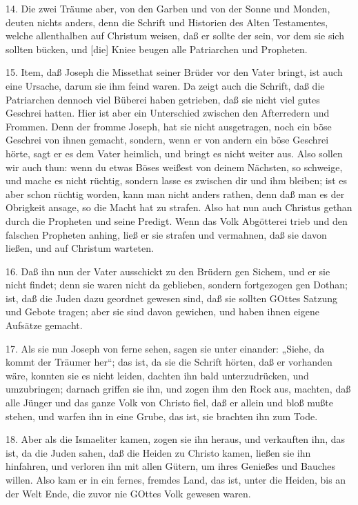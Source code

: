 14. Die zwei Träume aber, von den Garben und von der Sonne und Monden, deuten nichts anders, denn die Schrift und Historien des Alten Testamentes, welche allenthalben auf Christum weisen, daß er sollte der sein, vor dem sie sich sollten bücken, und [die] Kniee beugen alle Patriarchen und Propheten.

15. Item, daß Joseph die Missethat seiner Brüder vor den Vater bringt, ist auch eine Ursache, darum sie ihm feind waren. Da zeigt auch die Schrift, daß die Patriarchen dennoch viel Büberei haben getrieben, daß sie nicht viel gutes Geschrei hatten. Hier ist aber ein Unterschied zwischen den Afterredern und Frommen. Denn der fromme Joseph, hat sie nicht ausgetragen, noch ein böse Geschrei von ihnen gemacht, sondern, wenn er von andern ein böse Geschrei hörte, sagt er es dem Vater heimlich, und bringt es nicht weiter aus. Also sollen wir auch thun: wenn du etwas Böses weißest von deinem Nächsten, so schweige, und mache es nicht rüchtig, sondern lasse es zwischen dir und ihm bleiben; ist es aber schon rüchtig worden, kann man nicht anders rathen, denn daß man es der Obrigkeit ansage, so die Macht hat zu strafen. Also hat nun auch Christus gethan durch die Propheten und seine Predigt. Wenn das Volk Abgötterei trieb und den falschen Propheten anhing, ließ er sie strafen und vermahnen, daß sie davon ließen, und auf Christum warteten.

16. Daß ihn nun der Vater ausschickt zu den Brüdern gen Sichem, und er sie nicht findet; denn sie waren nicht da geblieben, sondern fortgezogen gen Dothan; ist, daß die Juden dazu geordnet gewesen sind, daß sie sollten GOttes Satzung und Gebote tragen; aber sie sind davon gewichen, und haben ihnen eigene Aufsätze gemacht.

17. Als sie nun Joseph von ferne sehen, sagen sie unter einander: „Siehe, da kommt der Träumer her“; das ist, da sie die Schrift hörten, daß er vorhanden wäre, konnten sie es nicht leiden, dachten ihn bald unterzudrücken, und umzubringen; darnach griffen sie ihn, und zogen ihm den Rock aus, machten, daß alle Jünger und das ganze Volk von Christo fiel, daß er allein und bloß mußte stehen, und warfen ihn in eine Grube, das ist, sie brachten ihn zum Tode.

18. Aber als die Ismaeliter kamen, zogen sie ihn heraus, und verkauften ihn, das ist, da die Juden sahen, daß die Heiden zu Christo kamen, ließen sie ihn hinfahren, und verloren ihn mit allen Gütern, um ihres Genießes und Bauches willen. Also kam er in ein fernes, fremdes Land, das ist, unter die Heiden, bis an der Welt Ende, die zuvor nie GOttes Volk gewesen waren.

